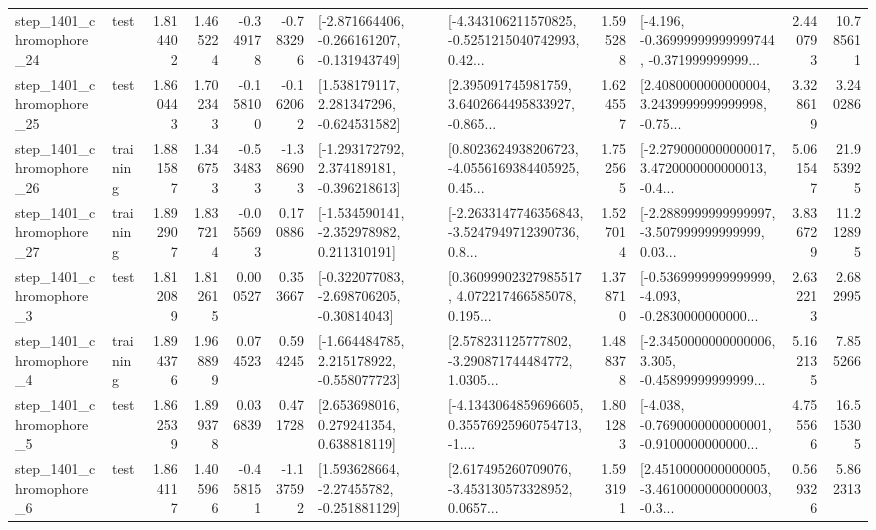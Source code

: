 \begin{tabular}{llrrrrllrlrr}
 step\_1401\_chromophore\_24 &      test &      1.814402 &    1.465224 &     -0.349178 & -0.783296 &  [-2.871664406, -0.266161207, -0.131943749] &  [-4.343106211570825, -0.5251215040742993, 0.42... &       1.595288 &  [-4.196, -0.36999999999999744, -0.371999999999... &            2.440793 &         10.785611 \\
 step\_1401\_chromophore\_25 &      test &      1.860443 &    1.702343 &     -0.158100 & -0.162062 &    [1.538179117, 2.281347296, -0.624531582] &  [2.395091745981759, 3.6402664495833927, -0.865... &       1.624557 &  [2.4080000000000004, 3.2439999999999998, -0.75... &            3.328619 &          3.240286 \\
 step\_1401\_chromophore\_26 &  training &      1.881587 &    1.346753 &     -0.534833 & -1.386903 &   [-1.293172792, 2.374189181, -0.396218613] &  [0.8023624938206723, -4.0556169384405925, 0.45... &       1.752565 &  [-2.2790000000000017, 3.4720000000000013, -0.4... &            5.061547 &         21.953925 \\
 step\_1401\_chromophore\_27 &  training &      1.892907 &    1.837214 &     -0.055693 &  0.170886 &   [-1.534590141, -2.352978982, 0.211310191] &  [-2.2633147746356843, -3.5247949712390736, 0.8... &       1.527014 &  [-2.2889999999999997, -3.507999999999999, 0.03... &            3.836729 &         11.212895 \\
  step\_1401\_chromophore\_3 &      test &      1.812089 &    1.812615 &      0.000527 &  0.353667 &   [-0.322077083, -2.698706205, -0.30814043] &  [0.36099902327985517, 4.072217466585078, 0.195... &       1.378710 &  [-0.5369999999999999, -4.093, -0.2830000000000... &            2.632213 &          2.682995 \\
  step\_1401\_chromophore\_4 &  training &      1.894376 &    1.968899 &      0.074523 &  0.594245 &   [-1.664484785, 2.215178922, -0.558077723] &  [2.578231125777802, -3.290871744484772, 1.0305... &       1.488378 &  [-2.3450000000000006, 3.305, -0.45899999999999... &            5.162135 &          7.855266 \\
  step\_1401\_chromophore\_5 &      test &      1.862539 &    1.899378 &      0.036839 &  0.471728 &     [2.653698016, 0.279241354, 0.638818119] &  [-4.1343064859696605, 0.35576925960754713, -1.... &       1.801283 &  [-4.038, -0.7690000000000001, -0.9100000000000... &            4.755566 &         16.515305 \\
  step\_1401\_chromophore\_6 &      test &      1.864117 &    1.405966 &     -0.458151 & -1.137592 &    [1.593628664, -2.27455782, -0.251881129] &  [2.617495260709076, -3.453130573328952, 0.0657... &       1.593191 &  [2.4510000000000005, -3.4610000000000003, -0.3... &            0.569326 &          5.862313 \\

\end{tabular}
